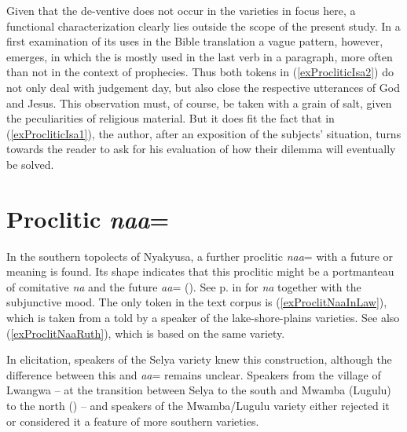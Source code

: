 Given that the de-ventive  does not occur in the varieties in focus here, a functional characterization clearly lies outside the scope of the present study. In a first examination of its uses in the Bible translation a vague pattern, however, emerges, in which the  is mostly used in the last verb in a paragraph, more often than not in the context of prophecies. Thus both tokens in (\ref{exProcliticIsa2}) do not only deal with judgement day, but also close the respective utterances of God and Jesus. This observation must, of course, be taken with a grain of salt, given the peculiarities of religious material. But it does fit the fact that in (\ref{exProcliticIsa1}), the author, after an exposition of the subjects' situation, turns towards the reader to ask for his evaluation of how their dilemma will eventually be solved.
\section{Proclitic \textit{naa}=}\label{ProcliticNaa}
In the southern topolects of Nyakyusa, a further proclitic \textit{naa}= with a future or  meaning is found. Its shape indicates that this proclitic might be a portmanteau of comitative \textit{na} and the future  \textit{aa}= (). See p.\nobreakspace\pageref{SubjunctiveNa} in  for \textit{na} together with the subjunctive mood. The only token in the text corpus is (\ref{exProclitNaaInLaw}), which is taken from a  told by a speaker of the lake-shore-plains varieties. See also (\ref{exProclitNaaRuth}), which is based on the same variety.

In elicitation, speakers of the Selya variety knew this construction, although the difference between this and  \textit{aa}= remains unclear. Speakers from the village of Lwangwa -- at the transition between Selya to the south and Mwamba (Lugulu) to the north () --
and speakers of the Mwamba/Lugulu variety either rejected it or considered it a feature of more southern varieties.

